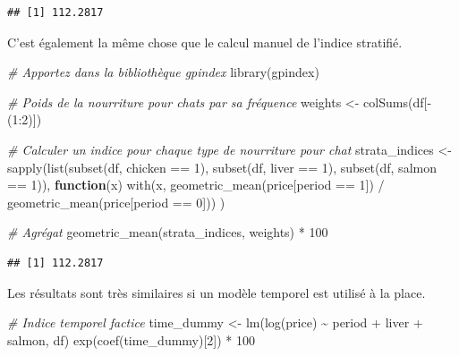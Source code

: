 \documentclass[
]{article}
\newenvironment{Shaded}{\begin{snugshade}}{\end{snugshade}}
\newcommand{\CommentTok}[1]{\textcolor[rgb]{0.56,0.35,0.01}{\textit{#1}}}
\newcommand{\ControlFlowTok}[1]{\textcolor[rgb]{0.13,0.29,0.53}{\textbf{#1}}}
\newcommand{\DecValTok}[1]{\textcolor[rgb]{0.00,0.00,0.81}{#1}}
\newcommand{\FunctionTok}[1]{\textcolor[rgb]{0.00,0.00,0.00}{#1}}
\newcommand{\NormalTok}[1]{#1}
\newcommand{\OtherTok}[1]{\textcolor[rgb]{0.56,0.35,0.01}{#1}}
\newcommand{\SpecialCharTok}[1]{\textcolor[rgb]{0.00,0.00,0.00}{#1}}
\begin{document}
\begin{verbatim}
## [1] 112.2817
\end{verbatim}

C'est également la même chose que le calcul manuel de l'indice stratifié.

\begin{Shaded}
\begin{Highlighting}[]
\CommentTok{\# Apportez dans la bibliothèque gpindex}
\FunctionTok{library}\NormalTok{(gpindex)}

\CommentTok{\# Poids de la nourriture pour chats par sa fréquence}
\NormalTok{weights }\OtherTok{\textless{}{-}} \FunctionTok{colSums}\NormalTok{(df[}\SpecialCharTok{{-}}\NormalTok{(}\DecValTok{1}\SpecialCharTok{:}\DecValTok{2}\NormalTok{)])}

\CommentTok{\# Calculer un indice pour chaque type de nourriture pour chat}
\NormalTok{strata\_indices }\OtherTok{\textless{}{-}} 
  \FunctionTok{sapply}\NormalTok{(}\FunctionTok{list}\NormalTok{(}\FunctionTok{subset}\NormalTok{(df, chicken }\SpecialCharTok{==} \DecValTok{1}\NormalTok{), }
              \FunctionTok{subset}\NormalTok{(df, liver }\SpecialCharTok{==} \DecValTok{1}\NormalTok{), }
              \FunctionTok{subset}\NormalTok{(df, salmon }\SpecialCharTok{==} \DecValTok{1}\NormalTok{)),}
         \ControlFlowTok{function}\NormalTok{(x) }\FunctionTok{with}\NormalTok{(x, }\FunctionTok{geometric\_mean}\NormalTok{(price[period }\SpecialCharTok{==} \DecValTok{1}\NormalTok{]) }\SpecialCharTok{/} \FunctionTok{geometric\_mean}\NormalTok{(price[period }\SpecialCharTok{==} \DecValTok{0}\NormalTok{]))}
\NormalTok{         )}

\CommentTok{\# Agrégat}
\FunctionTok{geometric\_mean}\NormalTok{(strata\_indices, weights) }\SpecialCharTok{*} \DecValTok{100}
\end{Highlighting}
\end{Shaded}

\begin{verbatim}
## [1] 112.2817
\end{verbatim}

Les résultats sont très similaires si un modèle temporel est utilisé à la place.

\begin{Shaded}
\begin{Highlighting}[]
\CommentTok{\# Indice temporel factice}
\NormalTok{time\_dummy }\OtherTok{\textless{}{-}} \FunctionTok{lm}\NormalTok{(}\FunctionTok{log}\NormalTok{(price) }\SpecialCharTok{\textasciitilde{}}\NormalTok{ period }\SpecialCharTok{+}\NormalTok{ liver }\SpecialCharTok{+}\NormalTok{ salmon, df)}
\FunctionTok{exp}\NormalTok{(}\FunctionTok{coef}\NormalTok{(time\_dummy)[}\DecValTok{2}\NormalTok{]) }\SpecialCharTok{*} \DecValTok{100}
\end{Highlighting}
\end{Shaded}
\end{document}
